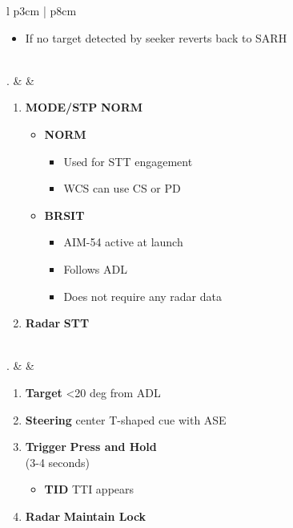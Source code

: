 \documentclass[8pt,usenames,dvipsnames,twoside]{article}
\begin{document}
\begin{center}
\begin{tabular}{l p{3cm} | p{8cm}}
\begin{minipage}[t]{\linewidth}
\begin{enumerate}[label=(\alph*)]
\begin{itemize}
\begin{itemize}
								\item If no target detected by seeker reverts back to SARH
							\end{itemize}
						\end{itemize}
					\end{enumerate}
				\end{minipage} \\
				. &  & 
				\begin{minipage}[t]{\linewidth}
					\vspace{-7pt}
					\begin{enumerate}[label=(\alph*)]
						\item \textbf{MODE/STP} \dotfill \textbf{NORM}
						\begin{itemize}
							\item \textbf{NORM}
							\begin{itemize}
								\item Used for STT engagement
								\item WCS can use CS or PD
							\end{itemize}
							\item \textbf{BRSIT}
							\begin{itemize}
								\item AIM-54 active at launch
								\item Follows ADL
								\item Does not require any radar data
							\end{itemize}
						\end{itemize}
						\item \textbf{Radar} \dotfill \textbf{STT}
					\end{enumerate}
				\end{minipage} \\
				. &  & 
				\begin{minipage}[t]{\linewidth}
					\vspace{-7pt}
					\begin{enumerate}[label=(\alph*)]
						\item \textbf{Target} \dotfill <20 deg from ADL
						\item \textbf{Steering} \dotfill center T-shaped cue with ASE
						\item \textbf{Trigger} \dotfill \textbf{Press and Hold} \\
						\hfill (3-4 seconds)
						\begin{itemize}
							\item \textbf{TID} TTI appears
						\end{itemize}
						
						\item \textbf{Radar} \dotfill \textbf{Maintain Lock}
					\end{enumerate}
				\end{minipage} \\
				\bottomrule
			\end{tabular}
		\end{center}
		
\end{document}
